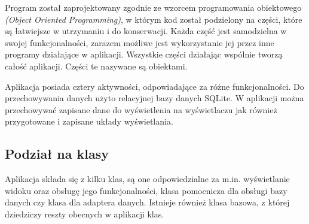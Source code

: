 \documentclass[a4paper,12pt, twoside]{article}
\begin{document}
    	Program został zaprojektowany zgodnie ze wzorcem programowania obiektowego \textit{(Object Oriented Programming)}\cite{oop}, w którym kod został podzielony na części, które są łatwiejsze w utrzymaniu i do konserwacji. Każda część jest samodzielna w swojej funkcjonalności, zarazem możliwe jest wykorzystanie jej przez inne programy działające w aplikacji. Wszystkie części działając wspólnie tworzą całość aplikacji. Części te nazywane są obiektami. 
    	
    	Aplikacja posiada cztery aktywności, odpowiadające za różne funkcjonalności. Do przechowywania danych użyto relacyjnej bazy danych SQLite. W aplikacji można przechowywać zapisane dane do wyświetlenia na wyświetlaczu jak również przygotowane i zapisane układy wyświetlania.
    	
    	\subsection{Podział na klasy}
    	Aplikacja składa się z kilku klas, są one odpowiedzialne za m.in. wyświetlanie widoku oraz obsługę jego funkcjonalności, klasa pomocnicza dla obsługi bazy danych czy klasa dla adaptera danych. Istnieje również klasa bazowa, z której dziedziczy reszty obecnych w aplikacji klas.
    	
\end{document}
